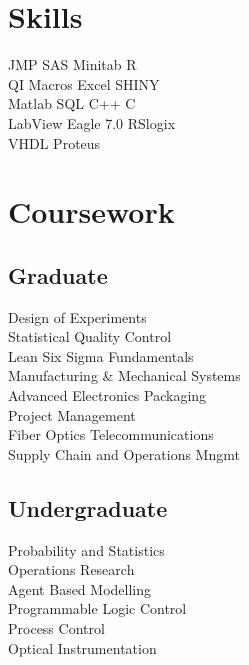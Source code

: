 \documentclass[]{bigfatnoob-resume}
\begin{document}
\begin{minipage}[t]{0.33\textwidth}
\section{Skills}
JMP SAS \textbullet{} Minitab \textbullet{} R \\ 
QI Macros \textbullet{} Excel \textbullet{} SHINY \\
Matlab \textbullet{} SQL \textbullet{} C++ \textbullet{} C\\
LabView \textbullet{} Eagle 7.0 \textbullet{} RSlogix \\
VHDL \textbullet{} Proteus
\sectionsep


\section{Coursework}
\subsection{Graduate}
Design of Experiments \\
Statistical Quality Control\\
Lean Six Sigma Fundamentals \\
Manufacturing \& Mechanical Systems\\
Advanced Electronics Packaging \\
Project Management \\
Fiber Optics Telecommunications \\
Supply Chain and Operations Mngmt \\



\sectionsep

\subsection{Undergraduate}
Probability and Statistics\\
Operations Research \\
Agent Based Modelling \\
Programmable Logic Control \\
Process Control\\
Optical Instrumentation\\

\sectionsep

%
%

\end{minipage} 
\end{document}
